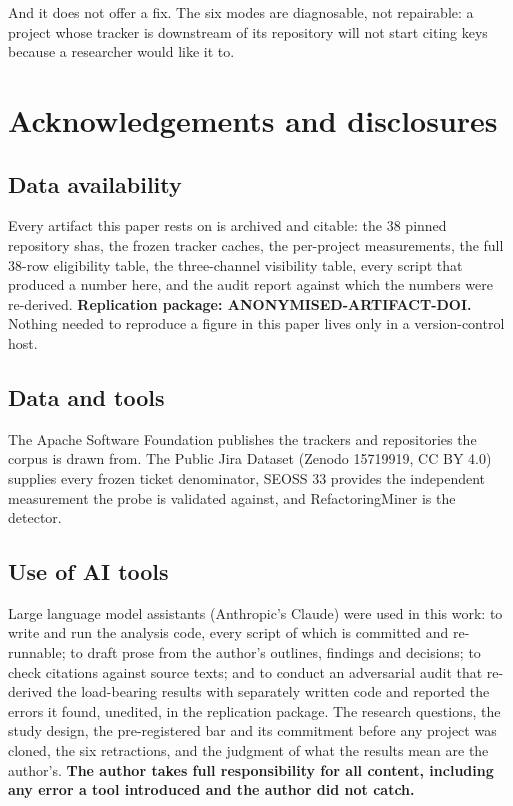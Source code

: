 \documentclass[sigconf,review,anonymous]{acmart}
\begin{document}
And it does not offer a fix. The six modes are diagnosable, not repairable: a project whose tracker is downstream of its repository will not start citing keys because a researcher would like it to.


\section{Acknowledgements and disclosures}
\label{sec:8}

\subsection{Data availability}
\label{sec:8.1}

Every artifact this paper rests on is archived and citable: the 38 pinned repository shas, the frozen tracker caches, the per-project measurements, the full 38-row eligibility table, the three-channel visibility table, every script that produced a number here, and the audit report against which the numbers were re-derived. \textbf{Replication package: ANONYMISED-ARTIFACT-DOI.} Nothing needed to reproduce a figure in this paper lives only in a version-control host.

\subsection{Data and tools}
\label{sec:8.2}

The Apache Software Foundation publishes the trackers and repositories the corpus is drawn from. The Public Jira Dataset (Zenodo 15719919, CC BY 4.0) supplies every frozen ticket denominator, SEOSS 33 provides the independent measurement the probe is validated against, and RefactoringMiner is the detector.

\subsection{Use of AI tools}
\label{sec:8.3}

Large language model assistants (Anthropic's Claude) were used in this work: to write and run the analysis code, every script of which is committed and re-runnable; to draft prose from the author's outlines, findings and decisions; to check citations against source texts; and to conduct an adversarial audit that re-derived the load-bearing results with separately written code and reported the errors it found, unedited, in the replication package. The research questions, the study design, the pre-registered bar and its commitment before any project was cloned, the six retractions, and the judgment of what the results mean are the author's. \textbf{The author takes full responsibility for all content, including any error a tool introduced and the author did not catch.}
\end{document}
